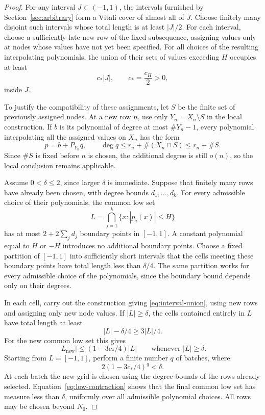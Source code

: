 \documentclass[11pt]{article}
\theoremstyle{definition}
\numberwithin{equation}{section}
\begin{document}
\begin{proof}
For any interval \(J\subset(-1,1)\), the intervals furnished by
Section~\ref{sec:arbitrary} form a Vitali cover of almost all of \(J\).
Choose finitely many disjoint such intervals whose total length is
at least \(|J|/2\).
For each interval, choose a sufficiently late new row of the fixed
subsequence, assigning values only at nodes whose values have not
yet been specified.
For all choices of the resulting interpolating polynomials, the
union of their sets of values exceeding \(H\) occupies at least
\begin{equation}\label{eq:interval-union}
 c_*|J|,\qquad c_*=\frac{c_H}{2}>0,
\end{equation}
inside \(J\).

To justify the compatibility of these assignments, let \(S\) be
the finite set of previously assigned nodes.
At a new row \(n\), use only \(Y_n=X_n\setminus S\) in the local
construction. If \(b\) is its polynomial of degree at most
\(\#Y_n-1\), every polynomial interpolating all the assigned values
on \(X_n\) has the form
\[
 p=b+P_{Y_n}q,\qquad
 \deg q\le r_n+\#(X_n\cap S)\le r_n+\#S.
\]
Since \(\#S\) is fixed before \(n\) is chosen, the additional degree
is still \(o(n)\), so the local conclusion remains applicable.

Assume \(0<\delta\le2\), since larger \(\delta\) is immediate.
Suppose that finitely many rows have already been chosen, with
degree bounds \(d_1,\ldots,d_k\).
For every admissible choice of their polynomials, the common low set
\[
 L=\bigcap_{j=1}^k\{x:|p_j(x)|\le H\}
\]
has at most \(2+2\sum_jd_j\) boundary points in \([-1,1]\).
A constant polynomial equal to \(H\) or \(-H\) introduces no
additional boundary points.
Choose a fixed partition of \([-1,1]\) into sufficiently short
intervals that the cells meeting these boundary points have total
length less than \(\delta/4\).
The same partition works for every admissible choice of the
polynomials, since the boundary bound depends only on their degrees.

In each cell, carry out the construction giving
\eqref{eq:interval-union}, using new rows and assigning only new
node values.
If \(|L|\ge\delta\), the cells contained entirely in \(L\) have
total length at least
\[
 |L|-\delta/4\ge3|L|/4.
\]
For the new common low set this gives
\begin{equation}\label{eq:low-contraction}
 |L_{\mathrm{new}}|
 \le (1-3c_*/4)|L|
 \qquad\text{whenever }|L|\ge\delta.
\end{equation}
Starting from \(L=[-1,1]\), perform a finite number \(q\) of batches,
where
\[
 2(1-3c_*/4)^q<\delta.
\]
At each batch the new grid is chosen using the degree bounds of
the rows already selected.
Equation~\eqref{eq:low-contraction} shows that the final common
low set has measure less than \(\delta\), uniformly over all
admissible polynomial choices.
All rows may be chosen beyond \(N_0\).


\end{proof}
\end{document}
